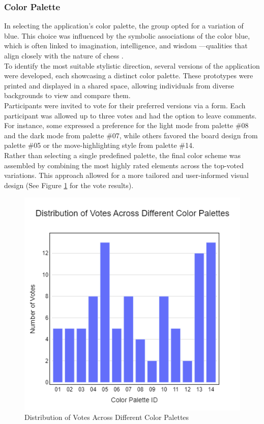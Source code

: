 \newpage

\subsubsection*{Color Palette}
\label{subsubsec:color-palette}

In selecting the application's color palette, the group opted for a variation of blue. This choice was influenced by the symbolic associations of the color blue, which is often linked to imagination, intelligence, and wisdom \cite{blue}—qualities that align closely with the nature of chess \cite{chess:ppqty, chess:chess-and-creativity}. \\

To identify the most suitable stylistic direction, several versions of the application were developed, each showcasing a distinct color palette. These prototypes were printed and displayed in a shared space, allowing individuals from diverse backgrounds to view and compare them. \\

Participants were invited to vote for their preferred versions via a form. Each participant was allowed up to three votes and had the option to leave comments. For instance, some expressed a preference for the light mode from palette \#08 and the dark mode from palette \#07, while others favored the board design from palette \#05 or the move-highlighting style from palette \#14. \\

Rather than selecting a single predefined palette, the final color scheme was assembled by combining the most highly rated elements across the top-voted variations. This approach allowed for a more tailored and user-informed visual design (See Figure \ref{fig:color-palette-results} for the vote results). \\

\begin{figure}[h!]
    \centering
    \includegraphics[width=0.75\linewidth]{figures/methods/color-palette-results.png}
    \caption{Distribution of Votes Across Different Color Palettes}
    \label{fig:color-palette-results}
\end{figure}

